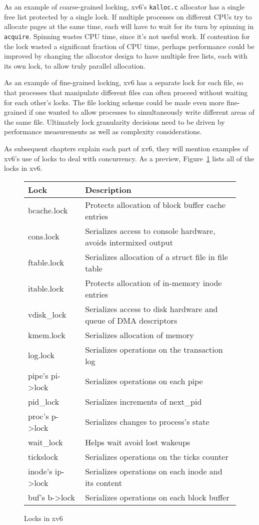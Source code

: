 As an example of coarse-grained locking, xv6's \lstinline{kalloc.c}
allocator has a single free list protected by a single lock. If
multiple processes on different CPUs try to allocate pages at the same
time, each will have to wait for its turn by spinning in {\tt
  acquire}. Spinning wastes CPU time, since it's not useful work.
If contention for the lock wasted a significant fraction of CPU time,
perhaps performance could be improved by changing the allocator design
to have multiple free lists, each with its own lock, to allow truly
parallel allocation.

As an example of fine-grained locking, xv6 has a separate lock for
each file, so that processes that manipulate different files can often
proceed without waiting for each other's locks. The file locking
scheme could be made even more fine-grained if one wanted to allow
processes to simultaneously write different areas of the same file.
Ultimately lock granularity decisions need to be driven by performance
measurements as well as complexity considerations.

As subsequent chapters explain each part of xv6, they
will mention examples of xv6's use of locks
to deal with concurrency.
As a preview,
Figure~\ref{fig:locktable}
lists all of the locks in xv6.

\begin{figure}[t]
\center
\begin{tabular}{ll}
{\bf Lock} & {\bf Description} \\
\midrule
bcache.lock & Protects allocation of block buffer cache entries \\
cons.lock & Serializes access to console hardware, avoids intermixed output \\
ftable.lock & Serializes allocation of a struct file in file table \\
itable.lock & Protects allocation of in-memory inode entries \\
vdisk\_lock & Serializes access to disk hardware and queue of DMA descriptors \\
kmem.lock & Serializes allocation of memory \\
log.lock & Serializes operations on the transaction log \\
pipe's pi->lock & Serializes operations on each pipe \\
pid\_lock & Serializes increments of next\_pid \\
proc's p->lock & Serializes changes to process's state \\
wait\_lock & Helps wait avoid lost wakeups \\
tickslock & Serializes operations on the ticks counter \\
inode's ip->lock & Serializes operations on each inode and its content \\
buf's b->lock & Serializes operations on each block buffer \\
\end{tabular}
\caption{Locks in xv6}
\label{fig:locktable}
\end{figure}

